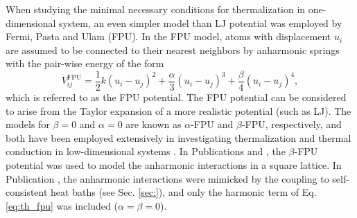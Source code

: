 When studying the minimal necessary conditions for thermalization in one-dimensional system, an even simpler model than LJ potential was employed by Fermi, Pasta and Ulam (FPU). In the FPU model, atoms with displacement $u_i$ are assumed to be connected to their nearest neighbors by anharmonic springs with the pair-wise energy of the form
\begin{equation}
  V_{ij}^{\textrm{FPU}} = \frac{1}{2} k (u_i-u_j)^2 + \frac{\alpha}{3} (u_i-u_j)^3+ \frac{\beta}{4} (u_i-u_j)^4, \label{eq:th_fpu}
\end{equation}
which is referred to as the FPU potential. The FPU potential can be considered to arise from the Taylor expansion of a more realistic potential (such as LJ). The models for $\beta=0$ and $\alpha=0$ are known as $\alpha$-FPU and $\beta$-FPU, respectively, and both have been employed extensively in investigating thermalization and thermal conduction in low-dimensional systems \cite{}. In Publications  and , the $\beta$-FPU potential was used to model the anharmonic interactions in a square lattice. In Publication , the anharmonic interactions were mimicked by the coupling to self-consistent heat baths (see Sec. \ref{sec:}), and only the harmonic term of Eq. \eqref{eq:th_fpu} was included ($\alpha=\beta=0$).

